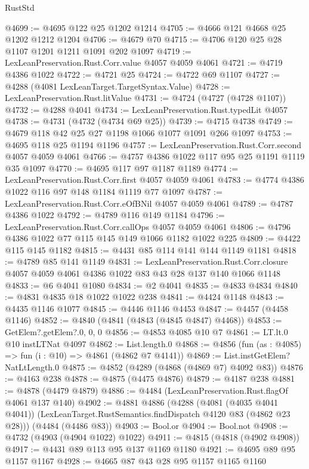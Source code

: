 \begin{lexlean}{RustStd}
\begin{coremodule}
@4699 := @4695 @122 @25 @1202 @1214
@4705 := @4666 @121 @4668 @25 @1202 @1212 @1204
@4706 := @4679 @70
@4715 := @4706 @120 @25 @28 @1107 @1201 @1211 @1091 @202 @1097
@4719 := LexLeanPreservation.Rust.Corr.value @4057 @4059 @4061
@4721 := @4719 @4386 @1022
@4722 := @4721 @25
@4724 := @4722 @69 @1107
@4727 := @4288 (@4081 LexLeanTarget.TargetSyntax.Value)
@4728 := LexLeanPreservation.Rust.litValue
@4731 := @4724 (@4727 (@4728 @1107))
@4732 := @4288 @4041
@4734 := LexLeanPreservation.Rust.typedLit @4057
@4738 := @4731 (@4732 (@4734 @69 @25))
@4739 := @4715 @4738
@4749 := @4679 @118 @42 @25 @27 @1198 @1066 @1077 @1091 @266 @1097
@4753 := @4695 @118 @25 @1194 @1196
@4757 := LexLeanPreservation.Rust.Corr.second @4057 @4059 @4061
@4766 := @4757 @4386 @1022 @117 @95 @25 @1191 @1119 @35 @1097
@4770 := @4695 @117 @97 @1187 @1189
@4774 := LexLeanPreservation.Rust.Corr.first @4057 @4059 @4061
@4783 := @4774 @4386 @1022 @116 @97 @148 @1184 @1119 @77 @1097
@4787 := LexLeanPreservation.Rust.Corr.eOfBNil @4057 @4059 @4061
@4789 := @4787 @4386 @1022
@4792 := @4789 @116 @149 @1184
@4796 := LexLeanPreservation.Rust.Corr.callOps @4057 @4059 @4061
@4806 := @4796 @4386 @1022 @77 @115 @145 @149 @1066 @1182 @1022 @225
@4809 := @4422 @115 @145 @1182
@4815 := @4431 @85 @114 @141 @144 @1149 @1181
@4818 := @4789 @85 @141 @1149
@4831 := LexLeanPreservation.Rust.Corr.closure
    @4057
    @4059
    @4061
    @4386
    @1022
    @83
    @43
    @28
    @137
    @140
    @1066
    @1148
@4833 := @6 @4041 @1080
@4834 := @2 @4041
@4835 := @4833 @4834
@4840 := @4831 @4835 @18 @1022 @1022 @238
@4841 := @4424 @1148
@4843 := @4435 @1146 @1077
@4845 := @4446 @1146 @4453
@4847 := @4457 (@4458 @1146)
@4852 := @4840 (@4841 (@4843 (@4845 @4847) @4468))
@4853 := GetElem?.getElem?.{0, 0, 0}
@4856 := @4853 @4085 @10 @7
@4861 := LT.lt.{0} @10 instLTNat @4097
@4862 := List.length.{0}
@4868 := @4856 (fun (as : @4085) => fun (i : @10) => @4861 (@4862 @7 @4141))
@4869 := List.instGetElem?NatLtLength.{0}
@4875 := @4852 (@4289 (@4868 (@4869 @7) @4092 @83))
@4876 := @4163 @238
@4878 := @4875 (@4475 @4876)
@4879 := @4187 @238
@4881 := @4878 (@4479 @4879)
@4886 := @4484 (LexLeanPreservation.Rust.flagOf @4061 @137 @140)
@4902 := @4881
    @4886
    (@4288
      (@4081 (@4035 @4041 @4041))
      (LexLeanTarget.RustSemantics.findDispatch @4120 @83 (@4862 @23 @28)))
    (@4484 (@4486 @83))
@4903 := Bool.or
@4904 := Bool.not
@4908 := @4732 (@4903 (@4904 @1022) @1022)
@4911 := @4815 (@4818 (@4902 @4908))
@4917 := @4431 @89 @113 @95 @137 @1169 @1180
@4921 := @4695 @89 @95 @1157 @1167
@4928 := @4665 @87 @43 @28 @95 @1157 @1165 @1160

\end{coremodule}
\end{lexlean}
